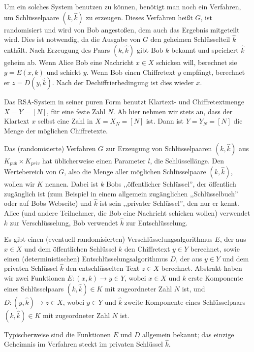 \documentclass[a4paper]{article}
\begin{document}
\begin{multicols}{3}
        Um ein solches System benutzen zu können, benötigt man noch ein Verfahren, um Schlüsselpaare $(k,\hat{k})$ zu erzeugen. Dieses Verfahren heißt $G$, ist randomisiert und wird von Bob angestoßen, dem auch das Ergebnis mitgeteilt wird. Dies ist notwendig, da die Ausgabe von $G$ den geheimen Schlüsselteil $\hat{k}$ enthält. Nach Erzeugung des Paars $(k,\hat{k})$ gibt Bob $k$ bekannt und speichert $\hat{k}$ geheim ab. Wenn Alice Bob eine Nachricht $x\in X$ schicken will, berechnet sie $y=E(x,k)$ und schickt $y$. Wenn Bob einen Chiffretext $y$ empfängt, berechnet er $z=D(y,\hat{k})$. Nach der Dechiffrierbedingung ist dies wieder $x$.

        Das RSA-System in seiner puren Form benutzt Klartext- und Chiffretextmenge $X=Y=[N]$, für eine feste Zahl $N$. Ab hier nehmen wir stets an, dass der Klartext $x$ selbst eine Zahl in $X = X_N= [N]$ ist. Dann ist $Y = Y_N= [N]$ die Menge der möglichen Chiffretexte.

        Das (randomisierte) Verfahren $G$ zur Erzeugung von Schlüsselpaaren $(k,\hat{k})$ aus $K_{pub} \times K_{priv}$ hat üblicherweise einen Parameter $l$, die Schlüssellänge. Den Wertebereich von $G$, also die Menge aller möglichen Schlüsselpaare $(k,\hat{k})$, wollen wir $K$ nennen. Dabei ist $k$ Bobs ,,öffentlicher Schlüssel'', der öffentlich zugänglich ist (zum Beispiel in einem allgemein zugänglichen ,,Schlüsselbuch'' oder auf Bobs Webseite) und $\hat{k}$ ist sein ,,privater Schlüssel'', den nur er kennt. Alice (und andere Teilnehmer, die Bob eine Nachricht schicken wollen) verwendet $k$ zur Verschlüsselung, Bob verwendet $\hat{k}$ zur Entschlüsselung.

        Es gibt einen (eventuell randomisierten) Verschlüsselungsalgorithmus $E$, der aus $x\in X$ und dem öffentlichen Schlüssel $k$ den Chiffretext $y\in Y$ berechnet, sowie einen (deterministischen) Entschlüsselungsalgorithmus $D$, der aus $y\in Y$ und dem privaten Schlüssel $\hat{k}$ den entschlüsselten Text $z\in X$ berechnet. Abstrakt haben wir zwei Funktionen $E: (x,k)\rightarrow y\in Y$, wobei $x\in X$ und $k$ erste Komponente eines Schlüsselpaars $(k,\hat{k})\in K$ mit zugeordneter Zahl $N$ ist, und $D:(y,\hat{k})\rightarrow z\in X$, wobei $y\in Y$ und $\hat{k}$ zweite Komponente eines Schlüsselpaars $(k,\hat{k})\in K$ mit zugeordneter Zahl $N$ ist.

        Typischerweise sind die Funktionen $E$ und $D$ allgemein bekannt; das einzige Geheimnis im Verfahren steckt im privaten Schlüssel $\hat{k}$.


\end{multicols}
\end{document}
